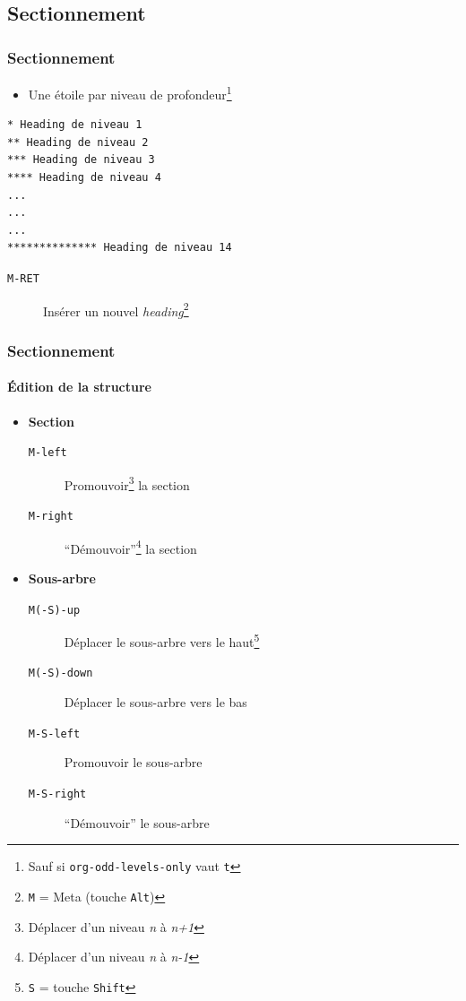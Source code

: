\documentclass[presentation,t,hideothersubsections]{beamer}
\begin{document}
\subsection{Sectionnement}
\label{sec-2-4}
\begin{frame}[fragile]
\frametitle{Sectionnement}
\label{sec-2-4-1}


\begin{itemize}
\item Une étoile par niveau de profondeur\footnote{Sauf si \texttt{org-odd-levels-only} vaut \texttt{t}
 }
\end{itemize}


\lstset{language=org}
\begin{lstlisting}
* Heading de niveau 1
** Heading de niveau 2
*** Heading de niveau 3
**** Heading de niveau 4
...
...
...
************** Heading de niveau 14
\end{lstlisting}

\begin{description}
\item[\texttt{M-RET}] Insérer un nouvel \emph{heading}\footnote{\texttt{M} = Meta (touche \texttt{Alt})
 }
\end{description}
\end{frame}
\begin{frame}
\frametitle{Sectionnement}
\framesubtitle{Édition de la structure}
\label{sec-2-4-2}


\begin{itemize}
\item \textbf{Section}
\begin{description}
\item[\texttt{M-left}] Promouvoir\footnote{Déplacer d'un niveau \emph{n} à \emph{n+1}
 } la section
\item[\texttt{M-right}] ``Démouvoir''\footnote{Déplacer d'un niveau \emph{n} à \emph{n-1}
 } la section
\end{description}
\item \textbf{Sous-arbre}
\begin{description}
\item[\texttt{M(-S)-up}] Déplacer le sous-arbre vers le haut\footnote{\texttt{S} = touche \texttt{Shift}
 }
\item[\texttt{M(-S)-down}] Déplacer le sous-arbre vers le bas
\item[\texttt{M-S-left}] Promouvoir le sous-arbre
\item[\texttt{M-S-right}] ``Démouvoir'' le sous-arbre
\end{description}
\end{itemize}
\end{frame}
\end{document}
